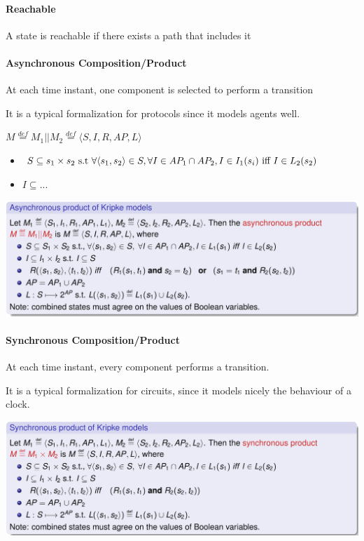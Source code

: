 \documentclass{article}
\begin{document}
\paragraph{Reachable} A state is reachable if there exists a path that includes it

\paragraph{Asynchronous Composition/Product} At each time instant, one component is selected to perform a transition

It is a typical formalization for protocols since it models agents well.

$M\overset{def}= M_1||M_2\overset{def}= \langle S,I,R,AP,L\rangle$
\begin{itemize}
    \item $S \subseteq s_1\times s_2 \text{ s.t } \forall\langle s_1,s_2\rangle \in S, \forall I \in AP_1\cap AP_2, I\in I_1(s_i) \text{ iff } I \in L_2(s_2)$
    \item $I \subseteq ...$
\end{itemize}
\begin{center}
    \includegraphics[width=1\linewidth]{images/async_prod.png}
\end{center}

\paragraph{Synchronous Composition/Product} At each time instant, every component performs a transition.

It is a typical formalization for circuits, since it models nicely the behaviour of a clock.
\begin{center}
    \includegraphics[width=1\linewidth]{images/sync_prod.png}
\end{center}
\end{document}
